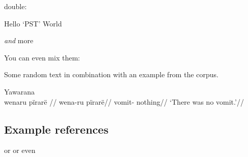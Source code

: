 \documentclass{memoir}
\begin{document}
double:

\pex\label{multiparttest} \a\label{test2} Hello  `PST'
\a\label{test3} World

\emph{and} more \xe

You can even mix them:

\pex\label{multiparttest2} \a\label{test4} Some random text in
combination with an example from the corpus.

\a Yawarana \\
\label{ctorat-20}    \begingl
    \glpreamble  wenaru pïrarë //
    \gla wena-ru pïrarë//
    \glb vomit- nothing//
        \glft ‘There was no vomit.’//  
    \endgl 

\xe

\subsection{Example references}


 or  or even 




\printbibliography
\end{document}
